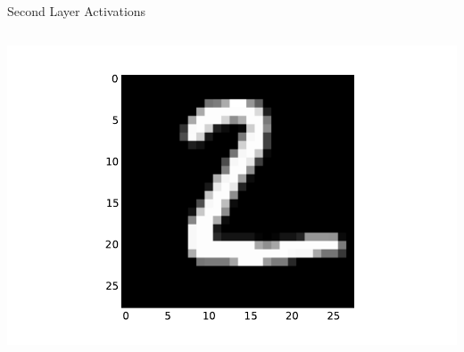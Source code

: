 \documentclass[10pt, aspectratio=169]{beamer} %
\begin{document}
\begin{frame}[fragile]{Second Layer Activations}
\begin{columns}
\includegraphics[width=\textwidth]{keras_l1_input_2.pdf}\\

\end{columns}
\end{frame}
\end{document}

